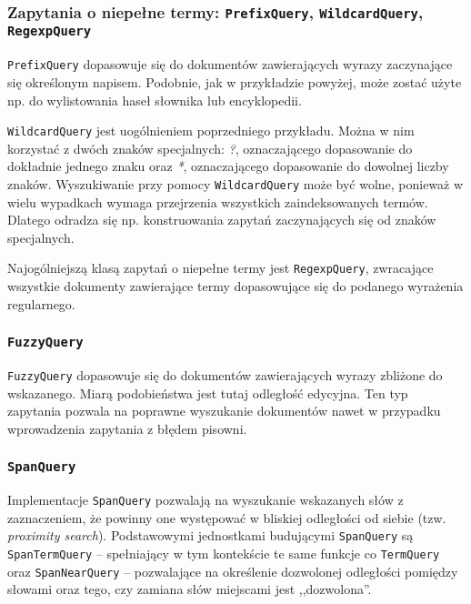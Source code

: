 \subsubsection{Zapytania o niepełne termy: \texttt{PrefixQuery}, \texttt{WildcardQuery}, \texttt{RegexpQuery}}

\texttt{PrefixQuery} dopasowuje się do dokumentów zawierających wyrazy zaczynające się określonym napisem. Podobnie, jak w przykładzie powyżej, może zostać użyte np. do wylistowania haseł słownika lub encyklopedii.

\texttt{WildcardQuery} jest uogólnieniem poprzedniego przykładu. Można w nim korzystać z dwóch znaków specjalnych: \emph{?}, oznaczającego dopasowanie do dokładnie jednego znaku oraz \emph{*}, oznaczającego dopasowanie do dowolnej liczby znaków. Wyszukiwanie przy pomocy \texttt{WildcardQuery} może być wolne, ponieważ w wielu wypadkach wymaga przejrzenia wszystkich zaindeksowanych termów. Dlatego odradza się np. konstruowania zapytań zaczynających się od znaków specjalnych.

Najogólniejszą klasą zapytań o niepełne termy jest \texttt{RegexpQuery}, zwracające wszystkie dokumenty zawierające termy dopasowujące się do podanego wyrażenia regularnego.

\subsubsection{\texttt{FuzzyQuery}}

\texttt{FuzzyQuery} dopasowuje się do dokumentów zawierających wyrazy zbliżone do wskazanego. Miarą podobieństwa jest tutaj odległość edycyjna. Ten typ zapytania pozwala na poprawne wyszukanie dokumentów nawet w przypadku wprowadzenia zapytania z błędem pisowni.

\subsubsection{\texttt{SpanQuery}}

Implementacje \texttt{SpanQuery} pozwalają na wyszukanie wskazanych słów z zaznaczeniem, że powinny one występować w bliskiej odległości od siebie (tzw. \emph{proximity search}). Podstawowymi jednostkami budującymi \texttt{SpanQuery} są \texttt{SpanTermQuery} -- spełniający w tym kontekście te same funkcje co \texttt{TermQuery} oraz \texttt{SpanNearQuery} -- pozwalające na określenie dozwolonej odległości pomiędzy słowami oraz tego, czy zamiana słów miejscami jest ,,dozwolona''.

